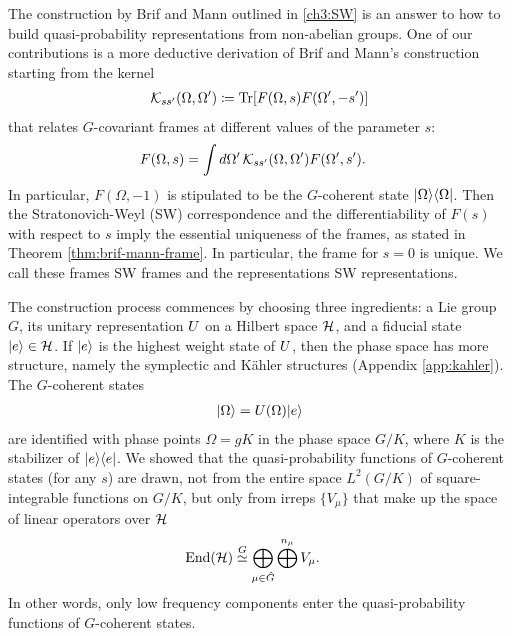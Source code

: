 The construction by Brif and Mann \cite{brif_phase-space_1999} outlined in \autoref{ch3:SW} is an answer to how to build quasi-probability representations from non-abelian groups. One of our contributions is a more deductive derivation of Brif and Mann's construction starting from the kernel
\begin{align}
	\mathcal{K}_{ss'}(\Omega,\Omega') \coloneqq \mathrm{Tr} [F(\Omega,s) F(\Omega',-s')]
\end{align}
that relates $G$-covariant frames at different values of the parameter $s$:
\begin{align}
	F(\Omega,s) &= \int d\Omega'\,\mathcal{K}_{ss'}(\Omega,\Omega') F(\Omega',s').
\end{align}
In particular, $F(\Omega,-1)$ is stipulated to be the $G$-coherent state ${\left\vert{\Omega}\right\rangle}{\left\langle{\Omega}\right\vert}$. Then the Stratonovich-Weyl (SW) correspondence and the differentiability of $F(s)$ with respect to $s$ imply the essential uniqueness of the frames, as stated in Theorem \ref{thm:brif-mann-frame}. In particular, the frame for $s=0$ is unique. We call these frames SW frames and the representations SW representations. 

The construction process commences by choosing three ingredients: a Lie group $G$, its unitary representation $U$ on a Hilbert space $\mathcal{H}$, and a fiducial state ${\left\vert{e}\right\rangle} \in \mathcal{H}$. If ${\left\vert{e}\right\rangle}$ is the highest weight state of $U$, then the phase space has more structure, namely the symplectic and K{\"a}hler structures (Appendix \ref{app:kahler}). The $G$-coherent states
\begin{align}
	{\left\vert{\Omega}\right\rangle} = U(\Omega){\left\vert{e}\right\rangle}
\end{align}
are identified with phase points $\Omega = gK$ in the phase space $G/K$, where $K$ is the stabilizer of ${\left\vert{e}\right\rangle}{\left\langle{e}\right\vert}$. We showed that the quasi-probability functions of $G$-coherent states (for any $s$) are drawn, not from the entire space $L^2(G/K)$ of square-integrable functions on $G/K$, but only from irreps $\{V_{\mu}\}$ that make up the space of linear operators over $\mathcal{H}$
\begin{align}
\text{End}(\mathcal{H}) &\stackrel{G}{\simeq} \bigoplus_{\mu \in \hat{G}} \bigoplus^{n_{\mu}} V_{\mu}.
\end{align}
In other words, only low frequency components enter the quasi-probability functions of $G$-coherent states.

